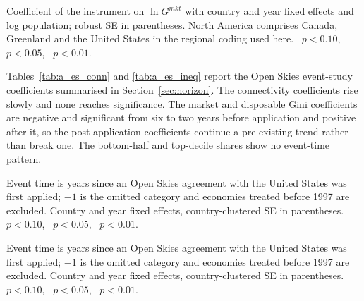 \begin{table}[H]\centering\caption{Reduced form on the market Gini, estimated separately by continent.}\label{tab:a_rfcont}
\begin{threeparttable}\small
\begin{tablenotes}\footnotesize\item Coefficient of the instrument on $\ln G^{mkt}$ with country and year fixed effects and log population; robust SE in parentheses. North America comprises Canada, Greenland and the United States in the regional coding used here. \sym{*}~$p<0.10$, \sym{**}~$p<0.05$, \sym{***}~$p<0.01$.\end{tablenotes}\end{threeparttable}\end{table}

Tables~\ref{tab:a_es_conn} and \ref{tab:a_es_ineq} report the Open Skies event-study coefficients summarised in Section~\ref{sec:horizon}. The connectivity coefficients rise slowly and none reaches significance. The market and disposable Gini coefficients are negative and significant from six to two years before application and positive after it, so the post-application coefficients continue a pre-existing trend rather than break one. The bottom-half and top-decile shares show no event-time pattern.

\begin{table}[H]\centering\caption{Open Skies event study: connectivity outcomes.}\label{tab:a_es_conn}
\begin{threeparttable}\small
\begin{tablenotes}\footnotesize\item Event time is years since an Open Skies agreement with the United States was first applied; $-1$ is the omitted category and economies treated before 1997 are excluded. Country and year fixed effects, country-clustered SE in parentheses. \sym{*}~$p<0.10$, \sym{**}~$p<0.05$, \sym{***}~$p<0.01$.\end{tablenotes}\end{threeparttable}\end{table}

\begin{table}[H]\centering\caption{Open Skies event study: inequality outcomes.}\label{tab:a_es_ineq}
\begin{threeparttable}\small
\begin{tablenotes}\footnotesize\item Event time is years since an Open Skies agreement with the United States was first applied; $-1$ is the omitted category and economies treated before 1997 are excluded. Country and year fixed effects, country-clustered SE in parentheses. \sym{*}~$p<0.10$, \sym{**}~$p<0.05$, \sym{***}~$p<0.01$.\end{tablenotes}\end{threeparttable}\end{table}


